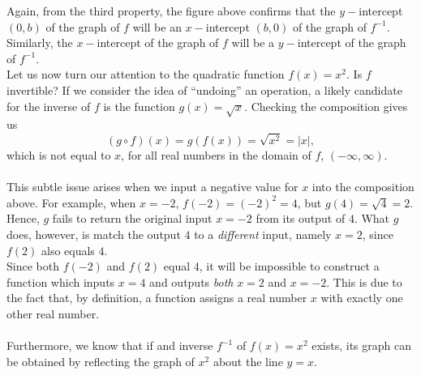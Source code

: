 \documentclass[11pt]{book}
\theoremstyle{definition}  %
\begin{document}
\begin{center}
\end{center}

Again, from the third property, the figure above confirms that the $y-$intercept $(0,b)$ of the graph of $f$ will be an $x-$intercept $(b,0)$ of the graph of $f^{-1}$.  Similarly, the $x-$intercept of the graph of $f$ will be a $y-$intercept of the graph of $f^{-1}$.\\


Let us now turn our attention to the quadratic function $f(x) = x^2$.  Is $f$ invertible?  If we consider the idea of ``undoing'' an operation, a likely candidate for the inverse of $f$ is the function $g(x) = \sqrt{x}$.  Checking the composition gives us
$$(g\circ f)(x) = g(f(x)) = \sqrt{x^2} = |x|,$$
which is not equal to $x$, for all real numbers in the domain of $f$, $(-\infty, \infty)$.\\
~\\
This subtle issue arises when we input a negative value for $x$ into the composition above.  For example, when $x=-2$,  $f(-2)= (-2)^2 = 4$, but $g(4) = \sqrt{4}=2$.  Hence, $g$ fails to return the original input $x=-2$ from its output of $4$.  What $g$ does, however, is match the output $4$ to a \textit{different} input, namely $x=2$, since $f(2)$ also equals $4$.\\
Since both $f(-2)$ and $f(2)$ equal $4$, it will be impossible to construct a function which inputs $x=4$ and outputs \textit{both} $x=2$ and $x=-2$.  This is due to the fact that, by definition, a function assigns a real number $x$ with exactly one other real number.\\
~\\
Furthermore, we know that if and inverse $f^{-1}$ of $f(x)=x^2$ exists, its graph can be obtained by reflecting the graph of $x^2$ about the line $y=x$.\\ 
\end{document}
